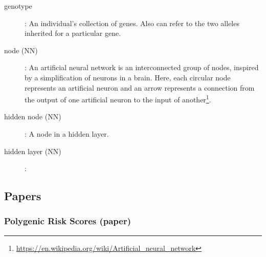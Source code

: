 \begin{description}
\item[genotype]:
	An individual's collection of genes. Also can refer to the two alleles inherited for a particular gene.

\item[node (NN)]:
	An artificial neural network is an interconnected group of nodes, inspired by a simplification of neurons in a brain. Here, each circular node represents an artificial neuron and an arrow represents a connection from the output of one artificial neuron to the input of another\footnote{\url{https://en.wikipedia.org/wiki/Artificial_neural_network}}.
\item[hidden node (NN)] : A node in a hidden layer.

\item[hidden layer (NN)]:

\end{description}
\subsection{Papers}
\subsubsection*{Polygenic Risk Scores (paper) \cite{wray2010multi}}
